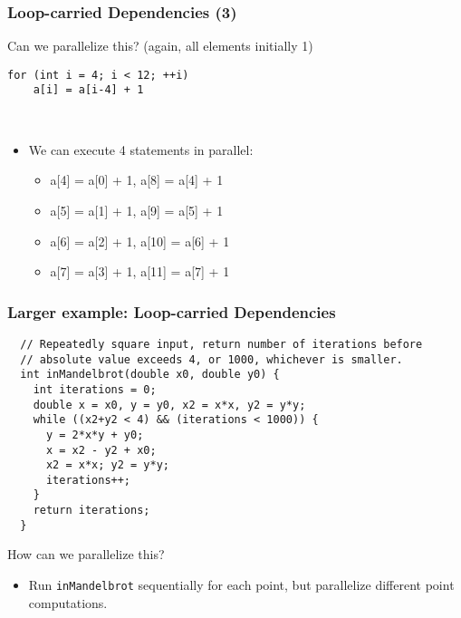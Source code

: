 \begin{frame}[fragile]
\frametitle{Loop-carried Dependencies (3)}

Can we parallelize this? (again, all elements initially 1)
\begin{lstlisting}
for (int i = 4; i < 12; ++i)
    a[i] = a[i-4] + 1
\end{lstlisting}
\pause
{}\\[1em]
\begin{itemize}
\item We can execute 4 statements in parallel:
\begin{itemize}
  \item a[4] = a[0] + 1, a[8] = a[4] + 1
  \item a[5] = a[1] + 1, a[9] = a[5] + 1
  \item a[6] = a[2] + 1, a[10] = a[6] + 1
  \item a[7] = a[3] + 1, a[11] = a[7] + 1
\end{itemize}  
\end{itemize}

\pause
{}

\end{frame}

\begin{frame}[fragile]
\frametitle{Larger example: Loop-carried Dependencies}
{\small \begin{verbatim}
  // Repeatedly square input, return number of iterations before 
  // absolute value exceeds 4, or 1000, whichever is smaller.
  int inMandelbrot(double x0, double y0) {
    int iterations = 0;
    double x = x0, y = y0, x2 = x*x, y2 = y*y;
    while ((x2+y2 < 4) && (iterations < 1000)) {
      y = 2*x*y + y0;
      x = x2 - y2 + x0;
      x2 = x*x; y2 = y*y;
      iterations++;
    }
    return iterations;
  }
\end{verbatim} 
}
How can we parallelize this? \\
\pause
\begin{itemize}
\item Run {\tt inMandelbrot} sequentially for each point, but parallelize
different point computations.
\end{itemize}
\end{frame}


